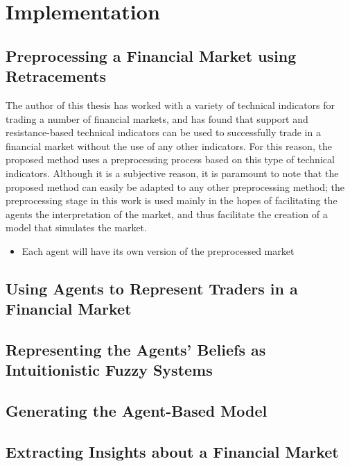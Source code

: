 \chapter{Implementation}
\label{chapter:implementation}

\section{Preprocessing a Financial Market using Retracements}
\label{section:preprocessing-a-financial-market-using-retracements:implementation}

The author of this thesis has worked with a variety of technical indicators for
trading a number of financial markets, and has found that support and
resistance-based technical indicators can be used to successfully trade in a
financial market without the use of any other indicators. For this reason, the
proposed method uses a preprocessing process based on this type of technical
indicators. Although it is a subjective reason, it is paramount to note that the
proposed method can easily be adapted to any other preprocessing method; the
preprocessing stage in this work is used mainly in the hopes of facilitating the
agents the interpretation of the market, and thus facilitate the creation of a
model that simulates the market.

\begin{itemize}
\item Each agent will have its own version of the preprocessed market
\end{itemize}

\section{Using Agents to Represent Traders in a Financial Market}
\label{section:using-agents-to-represent-traders-in-a-financial-market:implementation}

\section{Representing the Agents' Beliefs as Intuitionistic Fuzzy Systems}
\label{section:representing-the-agents-beliefs-as-intuitionistic-fuzzy-systems}

\section{Generating the Agent-Based Model}
\label{section:generating-the-agent-based-model}

\section{Extracting Insights about a Financial Market}
\label{section:extracting-insights-about-a-financial-market}
